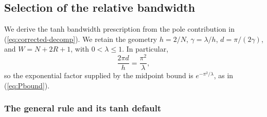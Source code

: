 \providecommand{\qeqref}[1]{(\ref{#1})}


\subsection{Selection of the relative bandwidth}
\label{sec:qi-bandwidth}

We derive the tanh bandwidth prescription from the pole contribution in
\qeqref{eq:corrected-decomp}. We retain the geometry
$h=2/N$, $\gamma=\lambda/h$, $d=\pi/(2\gamma)$, and
$W=N+2R+1$, with $0<\lambda\le1$. In particular,
\begin{equation}
 \frac{2\pi d}{h}=\frac{\pi^2}{\lambda},
 \label{eq:bandwidth-exponent}
\end{equation}
so the exponential factor supplied by the midpoint bound is
$e^{-\pi^2/\lambda}$, as in \qeqref{eq:Pbound}.

\providecommand{\BandwidthWidthFigure}{figures/bandwidth_width_rules.pdf}
\providecommand{\BandwidthErrorFigure}{figures/bandwidth_error_rules.pdf}

\subsubsection{The general rule and its tanh default}
\label{app:bw-general-rule}

